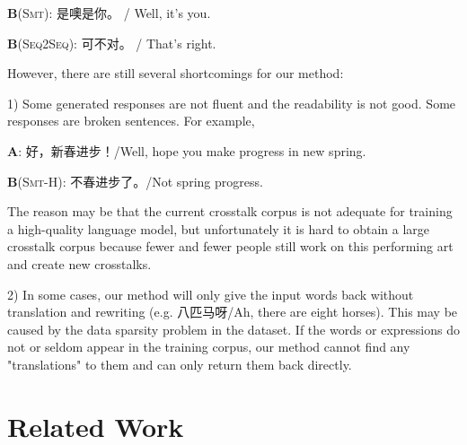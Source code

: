 \documentclass[letterpaper]{article} %
\begin{document}
\begin{CJK*}{UTF8}{gbsn}
\textbf{B}(\textsc{Smt}): 是噢是你。 / Well, it's you.

\textbf{B}(\textsc{Seq2Seq}): 可不对。 / That's right.

%
%
%
%

However, there are still several shortcomings for our method:

1) Some generated responses are not fluent and the readability is not good. Some responses are broken sentences. For example,

\textbf{A}: 好，新春进步！/Well, hope you make progress in new spring. 

\textbf{B}(\textsc{Smt-H}): 不春进步了。/Not spring progress. 

The reason may be that the current crosstalk corpus is not adequate for training a high-quality language model, but unfortunately it is hard to obtain a large crosstalk corpus because fewer and fewer people still work on this performing art and create new crosstalks.   

2) In some cases,  our method will only give the input words back without translation and rewriting (e.g. 八匹马呀/Ah, there are eight horses). This may be caused by the data sparsity problem in the dataset. If the words or expressions do not or seldom appear in the training corpus, our method cannot find any "translations" to them and can only return them back directly.  


\section{Related Work}


\end{CJK*}
\end{document}
